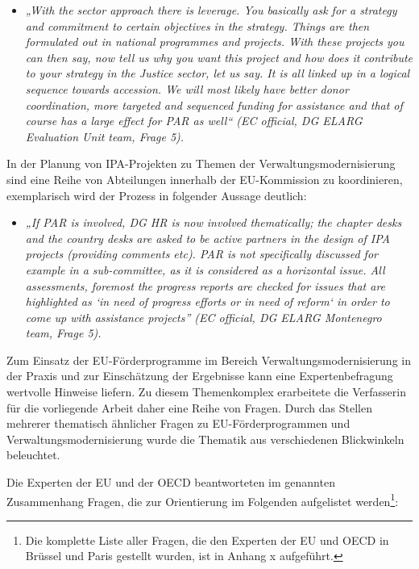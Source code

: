 \begin{itemize}[label={}]
\item \textit{„With the sector approach there is leverage. You basically ask for a strategy and commitment to certain objectives in the strategy. Things are then formulated out in national programmes and projects. With these projects you can then say, now tell us why you want this project and how does it contribute to your strategy in the Justice sector, let us say. It is all linked up in a logical sequence towards accession. We will most likely have better donor coordination, more targeted and sequenced funding for assistance and that of course has a large effect for PAR as well“ (EC official, DG ELARG Evaluation Unit team, Frage 5).}
\end{itemize}
In der Planung von IPA-Projekten zu Themen der Verwaltungsmodernisierung sind eine Reihe von Abteilungen innerhalb der EU-Kommission zu koordinieren, exemplarisch wird der Prozess in folgender Aussage deutlich:
\begin{itemize}[label={}]
\item \textit{„If PAR is involved, DG HR is now involved thematically; the chapter desks and the country desks are asked to be active partners in the design of IPA projects (providing comments etc). PAR is not specifically discussed for example in a sub-committee, as it is considered as a horizontal issue. All assessments, foremost the progress reports are checked for issues that are highlighted as `in need of progress efforts or in need of reform` in order to come up with assistance projects” (EC official, DG ELARG Montenegro team, Frage 5).}
\end{itemize}
Zum Einsatz der EU-Förderprogramme im Bereich Verwaltungsmodernisierung in der Praxis und zur Einschätzung der Ergebnisse kann eine Expertenbefragung wertvolle Hinweise liefern. Zu diesem Themenkomplex erarbeitete die Verfasserin für die vorliegende Arbeit daher eine Reihe von Fragen. Durch das Stellen mehrerer thematisch ähnlicher Fragen zu EU-Förderprogrammen und Verwaltungsmodernisierung wurde die Thematik aus verschiedenen Blickwinkeln beleuchtet.\par
Die Experten der EU und der OECD beantworteten im genannten Zusammenhang Fragen, die zur Orientierung im Folgenden aufgelistet werden\footnote{Die komplette Liste aller Fragen, die den Experten der EU und OECD in Brüssel und Paris gestellt wurden, ist in Anhang x aufgeführt.}:
